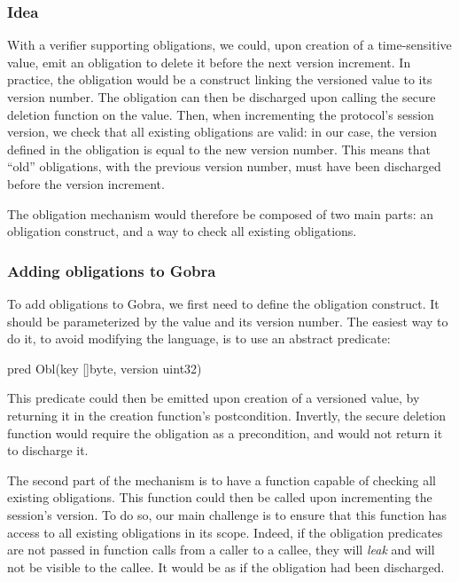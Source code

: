 \subsubsection{Idea}
\label{sec:obligations-idea}

With a verifier supporting obligations, we could, upon creation of a time-sensitive value, emit an obligation to delete it before the next version increment. 
In practice, the obligation would be a construct linking the versioned value to its version number.
The obligation can then be discharged upon calling the secure deletion function on the value.
Then, when incrementing the protocol's session version, we check that all existing obligations are valid: in our case, the version defined in the obligation is equal to the new version number.
This means that “old” obligations, with the previous version number, must have been discharged before the version increment.

The obligation mechanism would therefore be composed of two main parts: an obligation construct, and a way to check all existing obligations.

\subsubsection{Adding obligations to Gobra}
\label{sec:adding-obligations-to-gobra}

To add obligations to Gobra, we first need to define the obligation construct.
It should be parameterized by the value and its version number.
The easiest way to do it, to avoid modifying the language, is to use an abstract predicate:
\begin{gobra}
pred Obl(key []byte, version uint32)
\end{gobra}
This predicate could then be emitted upon creation of a versioned value, by returning it in the creation function's postcondition.
Invertly, the secure deletion function would require the obligation as a precondition, and would not return it to discharge it.

The second part of the mechanism is to have a function capable of checking all existing obligations. This function could then be called upon incrementing the session's version.
To do so, our main challenge is to ensure that this function has access to all existing obligations in its scope.
Indeed, if the obligation predicates are not passed in function calls from a caller to a callee, they will \emph{leak} and will not be visible to the callee. It would be as if the obligation had been discharged.

